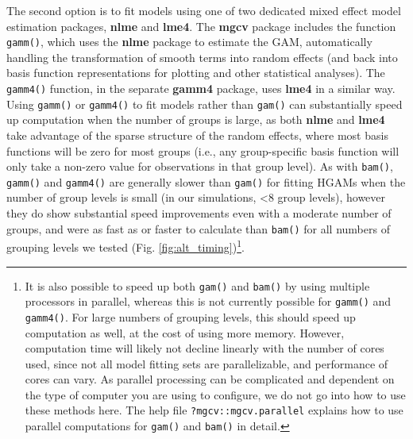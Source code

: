 \documentclass[12pt]{article}
\let\rmarkdownfootnote\footnote%
\def\footnote{\protect\rmarkdownfootnote}
\begin{document}
The second option is to fit models using one of two dedicated mixed
effect model estimation packages, \textbf{nlme} and \textbf{lme4}. The
\textbf{mgcv} package includes the function \texttt{gamm()}, which uses
the \textbf{nlme} package to estimate the GAM, automatically handling
the transformation of smooth terms into random effects (and back into
basis function representations for plotting and other statistical
analyses). The \texttt{gamm4()} function, in the separate \textbf{gamm4}
package, uses \textbf{lme4} in a similar way. Using \texttt{gamm()} or
\texttt{gamm4()} to fit models rather than \texttt{gam()} can
substantially speed up computation when the number of groups is large,
as both \textbf{nlme} and \textbf{lme4} take advantage of the sparse
structure of the random effects, where most basis functions will be zero
for most groups (i.e., any group-specific basis function will only take
a non-zero value for observations in that group level). As with
\texttt{bam()}, \texttt{gamm()} and \texttt{gamm4()} are generally
slower than \texttt{gam()} for fitting HGAMs when the number of group
levels is small (in our simulations, \textless{}8 group levels), however
they do show substantial speed improvements even with a moderate number
of groups, and were as fast as or faster to calculate than
\texttt{bam()} for all numbers of grouping levels we tested (Fig.
\ref{fig:alt_timing})\footnote{It is also possible to speed up both
  \texttt{gam()} and \texttt{bam()} by using multiple processors in
  parallel, whereas this is not currently possible for \texttt{gamm()}
  and \texttt{gamm4()}. For large numbers of grouping levels, this
  should speed up computation as well, at the cost of using more memory.
  However, computation time will likely not decline linearly with the
  number of cores used, since not all model fitting sets are
  parallelizable, and performance of cores can vary. As parallel
  processing can be complicated and dependent on the type of computer
  you are using to configure, we do not go into how to use these methods
  here. The help file \texttt{?mgcv::mgcv.parallel} explains how to use
  parallel computations for \texttt{gam()} and \texttt{bam()} in detail.}.
\end{document}
